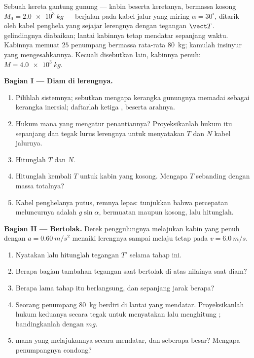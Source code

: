 \begin{problem}
\label{pb:g12:newtons-laws:1}
Sebuah kereta gantung gunung --- kabin beserta keretanya, bermassa kosong
$M_0 = \qty{2.0e3}{kg}$ --- berjalan pada kabel jalur yang miring $\alpha = 30^\circ$,
ditarik oleh kabel penghela yang sejajar lerengnya dengan tegangan $\vect T$. 
gelindingnya diabaikan; lantai kabinnya tetap mendatar sepanjang waktu. Kabinnya
memuat $25$ penumpang bermassa rata-rata \qty{80}{kg}; kamulah insinyur yang
mengesahkannya. Kecuali disebutkan lain, kabinnya penuh: $M = \qty{4.0e3}{kg}$.

\medskip
\noindent\textbf{Bagian I --- Diam di lerengnya.}
\begin{enumerate}
  \item Pilihlah sistemnya; sebutkan mengapa kerangka gunungnya memadai sebagai
        kerangka inersial; daftarlah ketiga , beserta arahnya.
  \item Hukum mana yang mengatur penantiannya? Proyeksikanlah hukum itu sepanjang dan
        tegak lurus lerengnya untuk menyatakan $T$ dan  $N$ kabel jalurnya.
  \item Hitunglah $T$ dan $N$.
  \item Hitunglah kembali $T$ untuk kabin yang kosong. Mengapa $T$ sebanding dengan
        massa totalnya?
  \item Kabel penghelanya putus, remnya lepas: tunjukkan bahwa percepatan meluncurnya
        adalah $g \sin\alpha$, bermuatan maupun kosong, lalu hitunglah.
\end{enumerate}

\medskip
\noindent\textbf{Bagian II --- Bertolak.} Derek penggulungnya melajukan kabin yang
penuh dengan $a = \qty{0.60}{m/s^2}$ menaiki lerengnya sampai melaju tetap pada
$v = \qty{6.0}{m/s}$.
\begin{enumerate}[resume]
  \item Nyatakan lalu hitunglah tegangan $T'$ selama tahap ini.
  \item Berapa bagian tambahan tegangan saat bertolak di atas nilainya saat diam?
  \item Berapa lama tahap itu berlangsung, dan sepanjang jarak berapa?
  \item Seorang penumpang \qty{80}{kg} berdiri di lantai yang mendatar. Proyeksikanlah
        hukum keduanya secara tegak untuk menyatakan lalu menghitung ;
        bandingkanlah dengan $mg$.
  \item {} mana yang melajukannya secara mendatar, dan seberapa besar? Mengapa
        penumpangnya condong?
\end{enumerate}


\end{problem}
